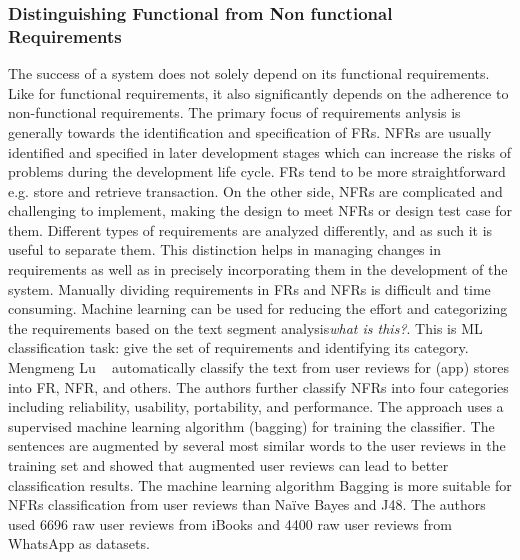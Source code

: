 \subsubsection{Distinguishing Functional from Non functional Requirements}

The success of a system does not solely depend on its functional requirements.
Like for functional requirements, it also significantly depends on the adherence
to non-functional requirements. The primary focus of requirements anlysis is
generally towards the identification and specification of FRs. NFRs are usually
identified and specified in later development stages which can increase the
risks of problems during the development life cycle. FRs tend to be more
straightforward e.g. store and retrieve transaction. On the
other side, NFRs are complicated and challenging to implement, making the
design to meet NFRs or design test case for them.
Different types of requirements are analyzed differently, and as such it is
useful to separate them. This distinction helps in managing changes in
requirements as well as in precisely incorporating them in the development of
the system. Manually dividing requirements in FRs and NFRs is difficult and
time consuming. Machine learning can be used for reducing the effort and
categorizing the requirements based on the text segment analysis\emph{what is
this?}. This is ML classification task: give the set of requirements and
identifying its category.\\

Mengmeng Lu \etal~ \cite{Lu:2017} automatically classify the text from user
reviews for (app) stores into FR, NFR, and others. The authors further classify
NFRs into four categories including reliability, usability, portability, and
performance. The approach uses a supervised machine learning algorithm
(bagging) for training the classifier.
 The sentences are
augmented by several most similar words to the user reviews in the training set
and showed that augmented user reviews can lead to better classification
results. The machine learning algorithm Bagging is more suitable
for NFRs classification from user reviews than Naïve Bayes and J48. The authors
used 6696 raw user reviews from iBooks and 4400 raw user reviews from WhatsApp
as datasets.\\

